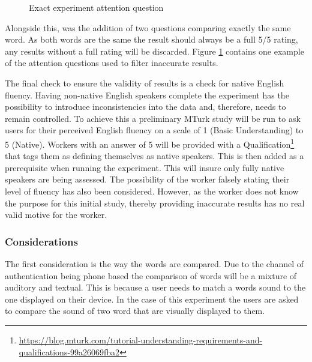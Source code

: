 \begin{figure}[h!]
    \centering
    \caption{Exact experiment attention question}
    \label{fig:exactMatch}
\end{figure}

Alongside this, was the addition of two questions comparing exactly the same word. As both words are the same the result should always be a full 5/5 rating, any results without a full rating will be discarded. Figure \ref{fig:exactMatch} contains one example of the attention questions used to filter inaccurate results.

The final check to ensure the validity of results is a check for native English fluency. Having non-native English speakers complete the 
experiment has the possibility to introduce inconsistencies into the 
data and, therefore, needs to remain controlled. To achieve this a 
preliminary MTurk study will be run to ask users for their perceived 
English fluency on a scale of 1 (Basic Understanding) to 5 (Native). 
Workers with an answer of 5 will be provided with a 
Qualification\footnote{\url{https://blog.mturk.com/tutorial-understanding-requirements-and-qualifications-99a26069fba2}} 
that tags them as defining themselves as native speakers. This is then 
added as a prerequisite when running the experiment. This will insure 
only fully native speakers are being assessed. The possibility of the 
worker falsely stating their level of fluency has also been considered. 
However, as the worker does not know the purpose for this initial study,
thereby providing inaccurate results has no real valid motive for the 
worker.

\subsubsection{Considerations}
\label{sec:exp1_considerations}

The first consideration is the way the words are compared. Due to the channel of authentication being phone based the comparison of words will be a mixture of auditory and textual. This is because a user needs to match a words sound to the one displayed on their device. In the case of this experiment the users are asked to compare the sound of two word that are visually displayed to them. 

